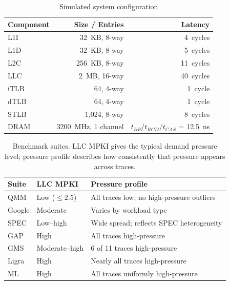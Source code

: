\documentclass[conference]{IEEEtran}
\begin{document}
\begin{table}[t!]
\centering
\small
\caption{Simulated system configuration}
\label{tab:config}
\begin{tabular}{lrr}
\toprule
\textbf{Component} & \textbf{Size / Entries} & \textbf{Latency} \\
\midrule
L1I  & 32~KB, 8-way  & 4~cycles \\
L1D  & 32~KB, 8-way  & 5~cycles \\
L2C  & 256~KB, 8-way & 11~cycles \\
LLC  & 2~MB, 16-way  & 40~cycles \\
\midrule
iTLB & 64, 4-way     & 1~cycle \\
dTLB & 64, 4-way     & 1~cycle \\
STLB & 1{,}024, 8-way & 8~cycles \\
\midrule
DRAM & 3200~MHz, 1 channel & $t_{RP}$/$t_{RCD}$/$t_{CAS}$ = 12.5~ns \\
\bottomrule
\end{tabular}
\end{table}

\begin{table}[t!]
\centering
\small
\caption{Benchmark suites. LLC MPKI gives the typical demand pressure level;
  pressure profile describes how consistently that pressure appears across traces.}
\label{tab:suites}
\begin{tabular}{lll}
\toprule
\textbf{Suite} & \textbf{LLC MPKI} & \textbf{Pressure profile} \\
\midrule
QMM    & Low (${\leq}2.5$)    & All traces low; no high-pressure outliers   \\
Google & Moderate             & Varies by workload type                     \\
SPEC   & Low--high            & Wide spread; reflects SPEC heterogeneity    \\
GAP    & High                 & All traces high-pressure                    \\
GMS    & Moderate--high       & 6 of 11 traces high-pressure                \\
Ligra  & High                 & Nearly all traces high-pressure             \\
ML     & High                 & All traces uniformly high-pressure          \\
\bottomrule
\end{tabular}
\end{table}
\end{document}
